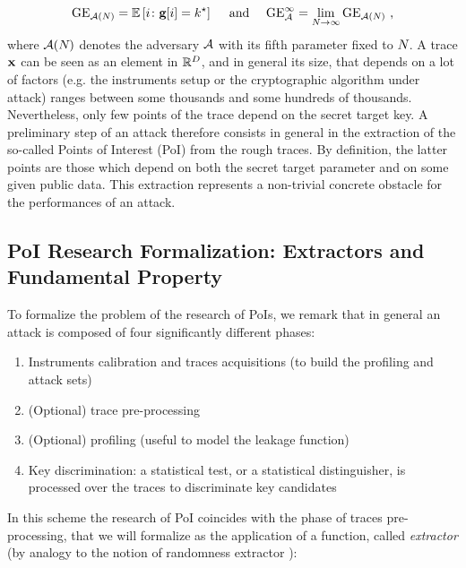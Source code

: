 \begin{equation}
\guessingEntropy_{\adversary(\numTraces[])}  = \mathbb{E}\left[i \colon \guessingVector[i] = \keyTest \right] \quad \mbox{ and } \quad \guessingEntropy^\infty_\adversary  = \lim_{\numTraces[]\rightarrow \infty} \guessingEntropy_{\adversary(\numTraces[])} \mbox{ ,}
\end{equation}
where $\adversary(\numTraces[])$ denotes the adversary $\adversary$ with its fifth parameter fixed to $\numTraces[]$.
A trace $\sss[]{}$ can be seen as an element in $\mathbb{R}^\traceLength$, and in general its size, that depends on a lot of factors (e.g. the instruments setup or the cryptographic algorithm under attack) ranges between some thousands and some hundreds of thousands. Nevertheless, only few points of the trace depend on the secret target key. A preliminary step of an attack therefore consists in general in the extraction of the so-called {Points of Interest (PoI)} from the  rough traces. By definition, the latter points are those which depend on both the secret target parameter and on some given public data. This extraction represents a non-trivial concrete obstacle for the performances of an attack.

\subsection{PoI Research Formalization: Extractors and Fundamental Property}


To formalize the problem of the research of PoIs, we remark that in general an attack is composed of four significantly different phases:

\begin{enumerate}
\item Instruments calibration and traces acquisitions (to build the profiling and attack sets)
\item (Optional) trace pre-processing
\item (Optional) profiling (useful to model the leakage function)
\item Key discrimination: a  statistical test, or a statistical distinguisher, is processed over the  traces to discriminate key candidates
\end{enumerate}
In this scheme the research of PoI coincides with the phase of traces pre-processing, that we will formalize as the application of a function, called {\em extractor} (by analogy to the notion of randomness extractor \cite{DBLP:journals/jcss/NisanZ96}):

